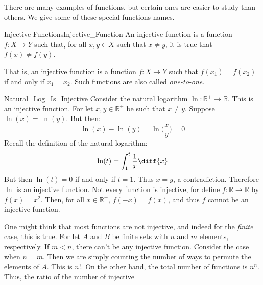             There are many examples of functions, but certain ones are easier
            to study than others. We give some of these special functions names.
            \begin{ldefinition}{Injective Functions}{Injective_Function}
                An \gls{injective function} is a function
                $f:X\rightarrow{Y}$ such that, for all
                $x,y\in{X}$ such that $x\ne{y}$, it is true that
                $f(x)\ne{f}(y)$.
            \end{ldefinition}
            That is, an injective function is a function
            $f:X\rightarrow{Y}$ such that $f(x_{1})=f(x_{2})$
            if and only if $x_{1}=x_{2}$. Such functions are also
            called \textit{one-to-one}.
            \begin{lexample}{}{Natural_Log_Is_Injective}
                Consider the natural logarithm
                $\ln:\mathbb{R}^{+}\rightarrow\mathbb{R}$. This is an injective
                function. For let $x,y\in\mathbb{R}^{+}$ be such that
                $x\ne{y}$. Suppose $\ln(x)=\ln(y)$. But then:
                \begin{equation}
                    \ln(x)-\ln(y)=\ln\Big(\frac{x}{y}\Big)=0
                \end{equation}
                Recall the definition of the natural logarithm:
                \begin{equation}
                    \ln(t)=\int_{1}^{t}\frac{1}{x}\diff{x}
                \end{equation}
                But then $\ln(t)=0$ if and only if $t=1$. Thus $x=y$, a
                contradiction. Therefore $\ln$ is an injective function. Not
                every function is injective, for define
                $f:\mathbb{R}\rightarrow\mathbb{R}$ by $f(x)=x^{2}$. Then, for
                all $x\in\mathbb{R}^{+}$, $f(\minus{x})=f(x)$, and thus $f$
                cannot be an injective function.
            \end{lexample}
            One might think that most functions are not injective,
            and indeed for the \textit{finite} case, this is true.
            For let $A$ and $B$ be finite sets with $n$ and $m$
            elements, respectively. If $m<n$, there can't be
            any injective function. Consider the case when $n=m$.
            Then we are simply counting the number of ways to
            permute the elements of $A$. This is $n!$. On the
            other hand, the total number of functions is
            $n^{n}$. Thus, the ratio of the number of injective
